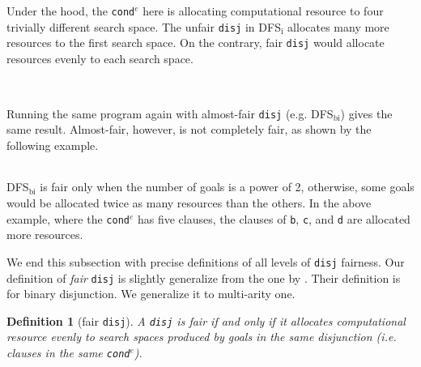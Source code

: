 \documentclass[format=acmlarge, review=true, authordraft=true]{acmart}
\newcommand{\conde}{\texttt{cond$^e$}}
\newcommand{\disj}{\texttt{disj}}
\newcommand{\DFSi }[0]{DFS$_\textrm{i}$}
\newcommand{\DFSbi}[0]{DFS$_\textrm{bi}$}
\newtheorem{defn}{Definition}[section]
\begin{document}
\begin{center}
	\begin{tabular}{c}
		
	\end{tabular}
\end{center}

Under the hood, the \conde{} here is allocating computational resource to 
four trivially different search space. The unfair \disj{} in 
\DFSi{} allocates many more resources to the first search space. On the 
contrary, fair \disj{} would allocate resources evenly to each search space. 

\begin{center}
	\begin{tabular}{c}
		
	\end{tabular}
\end{center}
\begin{center}
\begin{tabular}{c}
	
\end{tabular}
\end{center}

Running the same program again with almost-fair \disj {} (e.g. 
DFS$_\textrm{bi}$) gives the same result. Almost-fair, however, is not 
completely fair, as shown by the following example. 

\begin{center}
	\begin{tabular}{c}
		
	\end{tabular}
\end{center}

\DFSbi{} is fair only when the number of goals is a power of 2, 
otherwise, some goals would be allocated twice as many resources than the 
others. In the above example, where the \conde{} has five clauses, the clauses 
of \texttt{b}, \texttt{c}, and \texttt{d} are allocated more resources.

We end this subsection with precise definitions of all levels of 
\disj{} fairness. Our definition of \emph{fair} \disj{} is slightly generalize 
from the one by \citet{seres1999algebra}. Their definition is for binary 
disjunction. We generalize it to multi-arity one.

\begin{defn}[fair \disj{}]
A \disj{} is fair if and only if it allocates computational resource evenly to 
search spaces produced by goals in the same disjunction (i.e. clauses in 
the same \conde).
\end{defn}
\end{document}
